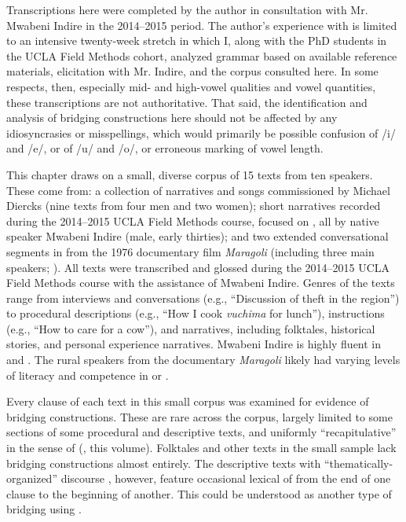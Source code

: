 \documentclass[output=paper]{LSP/langsci}
\begin{document}
Transcriptions here were completed by the author in consultation with Mr. Mwabeni Indire in the 2014--2015 period. The author’s experience with  is limited to an intensive twenty-week stretch in which I, along with the PhD students in the UCLA Field Methods cohort, analyzed  grammar based on available reference materials, elicitation with Mr. Indire, and the corpus consulted here. In some respects, then, especially mid- and high-vowel qualities and vowel quantities, these transcriptions are not authoritative. That said, the identification and analysis of bridging constructions here should not be affected by any idiosyncrasies or misspellings, which would primarily be possible confusion of /i/ and /e/, or of /u/ and /o/, or erroneous marking of vowel length. 

This chapter draws on a small, diverse corpus of 15  texts from ten speakers. These come from: a collection of  narratives and songs commissioned by Michael Diercks (nine texts from four men and two women); short narratives recorded during the 2014--2015 UCLA Field Methods course, focused on , all by native speaker Mwabeni Indire (male, early thirties); and two extended conversational segments in  from the 1976 documentary film \textit{Maragoli} (including three main  speakers; \citealt{Nichols1976}). All texts were transcribed and glossed during the 2014--2015 UCLA Field Methods course with the assistance of Mwabeni Indire. Genres of the texts range from interviews and conversations (e.g., ``Discussion of theft in the region'') to procedural descriptions (e.g., ``How I cook \textit{vuchima} for lunch''), instructions (e.g., ``How to care for a cow''), and narratives, including folktales, historical stories, and personal experience narratives. Mwabeni Indire is highly fluent in  and . The rural  speakers from the documentary \textit{Maragoli} likely had varying levels of literacy and competence in  or .

Every clause of each text in this small corpus was examined for evidence of bridging constructions. These are rare across the corpus, largely limited to some sections of some procedural and descriptive texts, and uniformly ``recapitulative'' in the sense of \citeauthor{guerin18} (, this volume). Folktales and other  texts in the small sample lack bridging constructions almost entirely. The descriptive texts with ``thematically-organized'' discourse \citep{farr99}, however, feature occasional lexical  of  from the end of one clause to the beginning of another. This could be understood as another type of bridging using .
\end{document}
